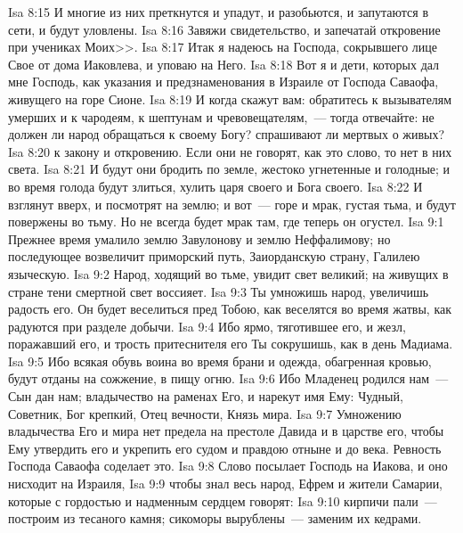 \vs Isa 8:15 И многие из них преткнутся и упадут, и разобьются, и запутаются в сети, и будут уловлены.
\vs Isa 8:16 Завяжи свидетельство, и запечатай откровение при учениках Моих>>.
\rsbpar\vs Isa 8:17 Итак я надеюсь на Господа, сокрывшего лице Свое от дома Иаковлева, и уповаю на Него.
\vs Isa 8:18 Вот я и дети, которых дал мне Господь, как указания и предзнаменования в Израиле от Господа Саваофа, живущего на горе Сионе.
\vs Isa 8:19 И когда скажут вам: обратитесь к вызывателям умерших и к чародеям, к шептунам и чревовещателям,~--- тогда отвечайте: не должен ли народ обращаться к своему Богу? спрашивают ли мертвых о живых?
\vs Isa 8:20  к закону и откровению. Если они не говорят, как это слово, то нет в них света.
\vs Isa 8:21 И будут они бродить по земле, жестоко угнетенные и голодные; и во время голода будут злиться, хулить царя своего и Бога своего.
\vs Isa 8:22 И взглянут вверх, и посмотрят на землю; и вот~--- горе и мрак, густая тьма, и будут повержены во тьму. Но не всегда будет мрак там, где теперь он огустел.
\vs Isa 9:1 Прежнее время умалило землю Завулонову и землю Неффалимову; но последующее возвеличит приморский путь, Заиорданскую страну, Галилею языческую.
\vs Isa 9:2 Народ, ходящий во тьме, увидит свет великий; на живущих в стране тени смертной свет воссияет.
\vs Isa 9:3 Ты умножишь народ, увеличишь радость его. Он будет веселиться пред Тобою, как веселятся во время жатвы, как радуются при разделе добычи.
\vs Isa 9:4 Ибо ярмо, тяготившее его, и жезл, поражавший его, и трость притеснителя его Ты сокрушишь, как в день Мадиама.
\vs Isa 9:5 Ибо всякая обувь воина во время брани и одежда, обагренная кровью, будут отданы на сожжение, в пищу огню.
\vs Isa 9:6 Ибо Младенец родился нам~--- Сын дан нам; владычество на раменах Его, и нарекут имя Ему: Чудный, Советник, Бог крепкий, Отец вечности, Князь мира.
\vs Isa 9:7 Умножению владычества Его и мира нет предела на престоле Давида и в царстве его, чтобы Ему утвердить его и укрепить его судом и правдою отныне и до века. Ревность Господа Саваофа соделает это.
\rsbpar\vs Isa 9:8 Слово посылает Господь на Иакова, и оно нисходит на Израиля,
\vs Isa 9:9 чтобы знал весь народ, Ефрем и жители Самарии, которые с гордостью и надменным сердцем говорят:
\vs Isa 9:10 кирпичи пали~--- построим из тесаного камня; сикоморы вырублены~--- заменим их кедрами.

